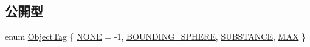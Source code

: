 \subsection*{公開型}
\begin{DoxyCompactItemize}
\item 
enum \mbox{\hyperlink{class_player_collision_a628e8898ff4fc1f85eb4ba44eb0a6907}{Object\+Tag}} \{ \mbox{\hyperlink{class_player_collision_a628e8898ff4fc1f85eb4ba44eb0a6907abde9854e7cb5dd2906a4f5e7ca3a896d}{N\+O\+NE}} = -\/1, 
\mbox{\hyperlink{class_player_collision_a628e8898ff4fc1f85eb4ba44eb0a6907ae8cec799ba827b372f0d4bedec1b9bbb}{B\+O\+U\+N\+D\+I\+N\+G\+\_\+\+S\+P\+H\+E\+RE}}, 
\mbox{\hyperlink{class_player_collision_a628e8898ff4fc1f85eb4ba44eb0a6907a1bdf29253670ff99684ddff916536360}{S\+U\+B\+S\+T\+A\+N\+CE}}, 
\mbox{\hyperlink{class_player_collision_a628e8898ff4fc1f85eb4ba44eb0a6907aa9f8cab198da5574b7a22acc4ecd42d5}{M\+AX}}
 \}
\end{DoxyCompactItemize}
